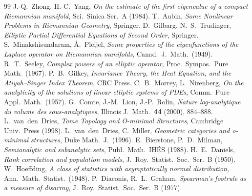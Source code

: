 \documentclass[11pt]{article}
\theoremstyle{remark}
\begin{document}
\begin{thebibliography}{99}
 J.-Q.~Zhong, H.-C.~Yang, \emph{On the estimate of the first eigenvalue of a compact Riemannian manifold}, Sci.\ Sinica Ser.\ A (1984).
 T.~Aubin, \emph{Some Nonlinear Problems in Riemannian Geometry}, Springer.
 D.~Gilbarg, N.~S.~Trudinger, \emph{Elliptic Partial Differential Equations of Second Order}, Springer.
 S.~Minakshisundaram, {\AA}.~Pleijel, \emph{Some properties of the eigenfunctions of the Laplace operator on Riemannian manifolds}, Canad.\ J.\ Math.\ (1949).
 R.~T.~Seeley, \emph{Complex powers of an elliptic operator}, Proc.\ Sympos.\ Pure Math.\ (1967).
 P.~B.~Gilkey, \emph{Invariance Theory, the Heat Equation, and the Atiyah--Singer Index Theorem}, CRC Press.
 C.~B.~Morrey, L.~Nirenberg, \emph{On the analyticity of the solutions of linear elliptic systems of PDEs}, Comm.\ Pure Appl.\ Math.\ (1957).
 G.~Comte, J.-M.~Lion, J.-P.~Rolin, \emph{Nature log-analytique du volume des sous-analytiques}, Illinois J.\ Math.\ \textbf{44} (2000), 884--888.
 L.~van~den~Dries, \emph{Tame Topology and O-minimal Structures}, Cambridge Univ.\ Press (1998).
 L.~van~den~Dries, C.~Miller, \emph{Geometric categories and o-minimal structures}, Duke Math.\ J.\ (1996).
 E.~Bierstone, P.~D.~Milman, \emph{Semianalytic and subanalytic sets}, Publ.\ Math.\ IH\'ES (1988).
 H.~E.~Daniels, \emph{Rank correlation and population models}, J.~Roy.\ Statist.\ Soc.\ Ser.\ B (1950).
 W.~Hoeffding, \emph{A class of statistics with asymptotically normal distribution}, Ann.\ Math.\ Statist.\ (1948).
 P.~Diaconis, R.~L.~Graham, \emph{Spearman's footrule as a measure of disarray}, J.~Roy.\ Statist.\ Soc.\ Ser.\ B (1977).
\end{thebibliography}
\end{document}

